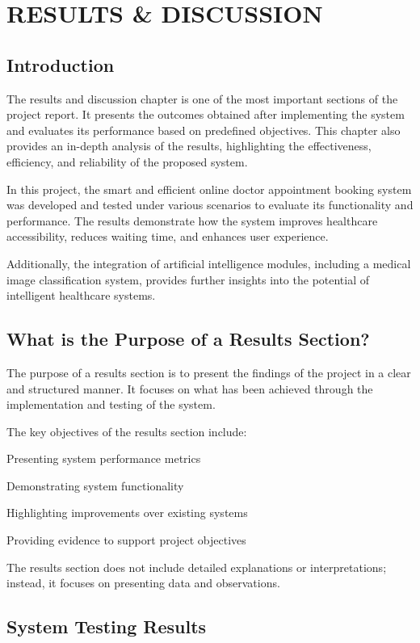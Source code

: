 \chapter{RESULTS & DISCUSSION}

\section{Introduction}

The results and discussion chapter is one of the most important sections of the project report. It presents the outcomes obtained after implementing the system and evaluates its performance based on predefined objectives. This chapter also provides an in-depth analysis of the results, highlighting the effectiveness, efficiency, and reliability of the proposed system.

In this project, the smart and efficient online doctor appointment booking system was developed and tested under various scenarios to evaluate its functionality and performance. The results demonstrate how the system improves healthcare accessibility, reduces waiting time, and enhances user experience.

Additionally, the integration of artificial intelligence modules, including a medical image classification system, provides further insights into the potential of intelligent healthcare systems.

\section{What is the Purpose of a Results Section?}

The purpose of a results section is to present the findings of the project in a clear and structured manner. It focuses on what has been achieved through the implementation and testing of the system.

The key objectives of the results section include:

Presenting system performance metrics

Demonstrating system functionality

Highlighting improvements over existing systems

Providing evidence to support project objectives

The results section does not include detailed explanations or interpretations; instead, it focuses on presenting data and observations.

\section{System Testing Results}

